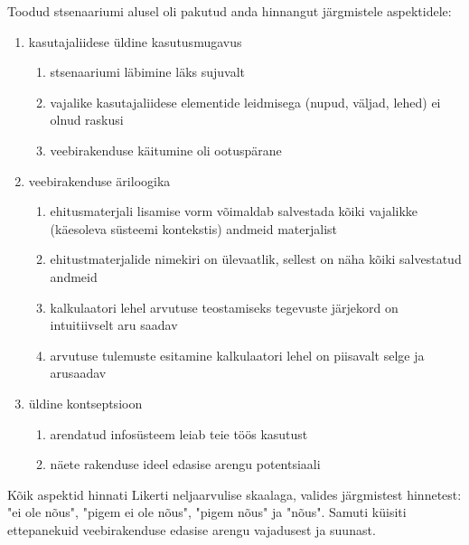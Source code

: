 Toodud stsenaariumi alusel oli pakutud anda hinnangut järgmistele aspektidele:
\begin{enumerate}
    \item kasutajaliidese üldine kasutusmugavus
    \begin{enumerate}
        \item stsenaariumi läbimine läks sujuvalt
        \item vajalike kasutajaliidese elementide leidmisega (nupud, väljad, lehed) ei olnud raskusi
        \item veebirakenduse käitumine oli ootuspärane
    \end{enumerate}
    \item veebirakenduse äriloogika 
    \begin{enumerate}
        \item ehitusmaterjali lisamise vorm võimaldab salvestada kõiki vajalikke (käesoleva süsteemi kontekstis) andmeid materjalist
        \item ehitustmaterjalide nimekiri on ülevaatlik, sellest on näha kõiki salvestatud andmeid
        \item kalkulaatori lehel arvutuse teostamiseks tegevuste järjekord on intuitiivselt aru saadav
        \item arvutuse tulemuste esitamine kalkulaatori lehel on piisavalt selge ja arusaadav
    \end{enumerate}
    \item üldine kontseptsioon
    \begin{enumerate}
        \item arendatud infosüsteem leiab teie töös kasutust
        \item näete rakenduse ideel edasise arengu potentsiaali
    \end{enumerate}
\end{enumerate}

Kõik aspektid hinnati Likerti neljaarvulise skaalaga, valides järgmistest hinnetest: "ei ole nõus", "pigem ei ole nõus", "pigem nõus" ja "nõus". 
Samuti küisiti ettepanekuid veebirakenduse edasise arengu vajadusest ja suunast. 


